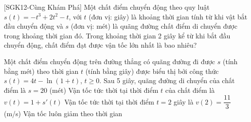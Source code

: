 \begin{bt}%
 [SGK12-Cùng Khám Phá]
	Một chất điểm chuyển động theo quy luật $s(t)=-t^3+2t^2-t$, với $t$ (đơn vị: giây) là khoảng thời gian tính từ khi vật bắt đầu chuyển động và $s$ (đơn vị: mét) là quãng đường chất điểm di chuyển được trong khoảng thời gian đó. Trong khoảng thời gian 2 giây kể từ khi bắt đầu chuyển động, chất điểm đạt được vận tốc lớn nhất là bao nhiêu?
\end{bt}

\begin{ex}%
	Một chất điểm chuyển động trên đường thẳng có quãng đường đi được $s$ (tính bằng mét) theo thời gian $t$ (tính bằng giây) được biểu thị bởi công thức $s(t)=4t-\ln(1+t)$, $t\geq 0$.
	\choiceTF
	{Sau 5 giây, quãng đường di chuyển của chất điểm là $s=20$ (mét)}
	{Vận tốc tức thời tại thời điểm $t$ của chất điểm là $v(t)=1+s'(t)$}
	{\True Vận tốc tức thời tại thời điểm $t=2$ giây là $v(2)=\dfrac{11}{3}$ (m/s)}
	{Vận tốc luôn giảm theo thời gian}
\end{ex}

